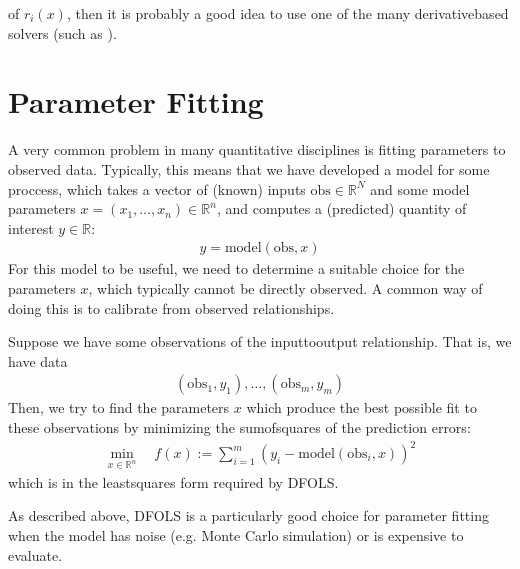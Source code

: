 \documentclass[letterpaper,10pt,english]{sphinxmanual}
\begin{document}
 of \(r_i(x)\), then it is probably a good idea to use one of the many derivative\sphinxhyphen{}based solvers (such as ).


\section{Parameter Fitting}
\label{\detokenize{info:parameter-fitting}}
A very common problem in many quantitative disciplines is fitting parameters to observed data. Typically, this means that we have developed a model for some proccess, which takes a vector of (known) inputs \(\mathrm{obs}\in\mathbb{R}^N\) and some model parameters \(x=(x_1, \ldots, x_n)\in\mathbb{R}^n\), and computes a (predicted) quantity of interest \(y\in\mathbb{R}\):
\begin{equation*}
\begin{split}y = \mathrm{model}(\mathrm{obs}, x)\end{split}
\end{equation*}
For this model to be useful, we need to determine a suitable choice for the parameters \(x\), which typically cannot be directly observed. A common way of doing this is to calibrate from observed relationships.

Suppose we have some observations of the input\sphinxhyphen{}to\sphinxhyphen{}output relationship. That is, we have data
\begin{equation*}
\begin{split}(\mathrm{obs}_1, y_1), \ldots, (\mathrm{obs}_m, y_m)\end{split}
\end{equation*}
Then, we try to find the parameters \(x\) which produce the best possible fit to these observations by minimizing the sum\sphinxhyphen{}of\sphinxhyphen{}squares of the prediction errors:
\begin{equation*}
\begin{split}\min_{x\in\mathbb{R}^n}  \quad  f(x) := \sum_{i=1}^{m}(y_i - \mathrm{model}(\mathrm{obs}_i, x))^2\end{split}
\end{equation*}
which is in the least\sphinxhyphen{}squares form required by DFO\sphinxhyphen{}LS.

As described above, DFO\sphinxhyphen{}LS is a particularly good choice for parameter fitting when the model has noise (e.g. Monte Carlo simulation) or is expensive to evaluate.
\end{document}
